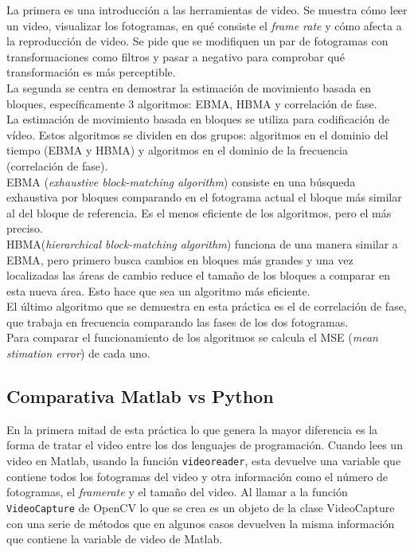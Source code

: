 La primera es una introducción a las herramientas de video. Se muestra cómo leer un video, visualizar los fotogramas, en qué consiste el \emph{frame rate} y cómo afecta a la reproducción de video. Se pide que se modifiquen un par de fotogramas con transformaciones como filtros y pasar a negativo para comprobar qué transformación es más perceptible.\\

La segunda se centra en demostrar la estimación de movimiento basada en bloques, específicamente 3 algoritmos: EBMA, HBMA y correlación de fase.\\

La estimación de movimiento basada en bloques se utiliza para codificación de vídeo. Estos algoritmos se dividen en dos grupos: algoritmos en el dominio del tiempo (EBMA y HBMA) y algoritmos en el dominio de la frecuencia (correlación de fase).\\

EBMA (\emph{exhaustive block-matching algorithm}) consiste en una búsqueda exhaustiva por bloques comparando en el fotograma actual el bloque más similar al del bloque de referencia. Es el menos eficiente de los algoritmos, pero el más preciso.\\

HBMA(\emph{hierarchical block-matching algorithm}) funciona de una manera similar a EBMA, pero primero busca cambios en bloques más grandes y una vez localizadas las áreas de cambio reduce el tamaño de los bloques a comparar en esta nueva área. Esto hace que sea un algoritmo más eficiente.\\

El último algoritmo que se demuestra en esta práctica es el de correlación de fase, que trabaja en frecuencia comparando las fases de los dos fotogramas.\\

Para comparar el funcionamiento de los algoritmos se calcula el MSE (\emph{mean stimation error}) de cada uno.\\

\subsection{Comparativa Matlab vs Python}

En la primera mitad de esta práctica lo que genera la mayor diferencia es la forma de tratar el video entre los dos lenguajes de programación. Cuando lees un video en Matlab, usando la función \texttt{videoreader}, esta devuelve una variable que contiene todos los fotogramas del video y otra información como el número de fotogramas, el \emph{framerate} y el tamaño del video. Al llamar a la función \texttt{VideoCapture} de OpenCV lo que se crea es un objeto de la clase VideoCapture con una serie de métodos que en algunos casos devuelven la misma información que contiene la variable de video de Matlab.\\

